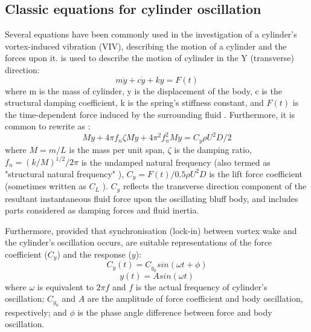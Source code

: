 \subsection{Classic equations for cylinder oscillation}
Several equations have been commonly used in the investigation of a cylinder's vortex-induced vibration (VIV), describing the motion of a cylinder and the forces upon it.  is used to describe the motion of cylinder in the Y (transverse) direction:
\begin{equation}	\label{eq:1}
	m\ddot{y}+c\dot{y}+ky=F(t)
\end{equation}
where m is the mass of cylinder, y is the displacement of the body,  c is the structural damping coefficient, k is the spring's stiffness constant, and $F(t)$ is the time-dependent force induced by the surrounding fluid \cite{bearman1984}. Furthermore, it is common to rewrite  as :
\begin{equation}	\label{eq:1a}
	M\ddot{y}+4\pi f_n \zeta M \dot{y}+4{\pi}^2{f_n^2} M y=C_y \rho U^2 D /2
\end{equation}
where $M=m/L$ is the mass per unit span, $\zeta$ is the damping ratio, $f_n=(k/M)^{1/2} / 2\pi$ is the undamped natural frequency (also termed as "structural natural frequency" \cite{Zhao2013}), $C_y=F(t)/0.5 \rho U^2 D $ is the lift force coefficient (sometimes written as $C_L$ \cite{Zhao2013a}). $C_y$ reflects the transverse direction component of the resultant instantaneous fluid force upon the oscillating bluff body, and includes parts considered as damping forces and fluid inertia.

Furthermore, provided that synchronisation (lock-in) between vortex wake and the cylinder's oscillation occurs,  are suitable representations of the force coefficient ($C_y$) and the response ($y$):
\begin{equation}	\label{eq:2}
	C_y(t)=C_{y_0} sin(\omega t+\phi)
\end{equation}
\begin{equation}	\label{eq:3}
	y(t)=A sin(\omega t)
\end{equation}
where $\omega$ is equivalent to $2\pi f$ and $f$ is the actual frequency of cylinder's oscillation; $C_{y_0}$ and $A$ are the amplitude of force coefficient and body oscillation, respectively; and $\phi$ is the phase angle difference between force and body oscillation. 


